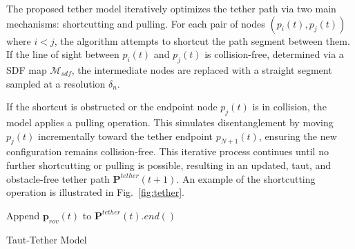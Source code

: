 The proposed tether model iteratively optimizes the tether path via two main mechanisms: shortcutting and pulling. For each pair of nodes \( (p_i(t), p_j(t)) \) where \( i < j \), the algorithm attempts to shortcut the path segment between them. If the line of sight between \( p_i(t) \) and \( p_j(t) \) is collision-free, determined via a \ac{SDF} map \( \mathcal{M}_{sdf} \), the intermediate nodes are replaced with a straight segment sampled at a resolution \( \delta_n \).

If the shortcut is obstructed or the endpoint node \( p_j(t) \) is in collision, the model applies a pulling operation. This simulates disentanglement by moving \( p_j(t) \) incrementally toward the tether endpoint \( p_{N+1}(t) \), ensuring the new configuration remains collision-free. This iterative process continues until no further shortcutting or pulling is possible, resulting in an updated, taut, and obstacle-free tether path \( \mathbf{P}^{tether}(t+1) \). An example of the shortcutting operation is illustrated in Fig.~\ref{fig:tether}.


\begin{algorithm}[H]
\LinesNotNumbered  %

\BlankLine

Append $\mathbf{p}_{rov}(t)$ to $\mathbf{P}^{tether}(t).end()$\;


\;
\caption{Taut-Tether Model}
\label{alg:tether_optimization}
\end{algorithm}











